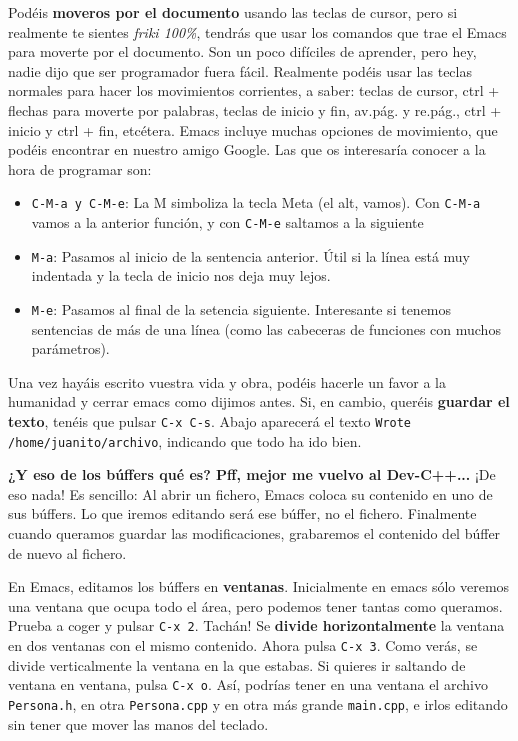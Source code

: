 \documentclass[landscape]{article}
\begin{document}
\begin{multicols*}{2}
Podéis \textbf{moveros por el documento} usando las teclas de cursor, pero si realmente te sientes \textit{friki 100\%}, tendrás que usar los comandos que trae el Emacs para moverte por el documento. Son un poco difíciles de aprender, pero hey, nadie dijo que ser programador fuera fácil. Realmente podéis usar las teclas normales para hacer los movimientos corrientes, a saber: teclas de cursor, ctrl + flechas para moverte por palabras, teclas de inicio y fin, av.pág. y re.pág., ctrl + inicio y ctrl + fin, etcétera. Emacs incluye muchas opciones de movimiento, que podéis encontrar en nuestro amigo Google. Las que os interesaría conocer a la hora de programar son:
\vspace{-0.5cm}
\begin{itemize}
 \item \texttt{C-M-a y C-M-e}: La M simboliza la tecla Meta (el alt, vamos). Con \texttt{C-M-a} vamos a la anterior función, y con \texttt{C-M-e} saltamos a la siguiente
\item \texttt{M-a}: Pasamos al inicio de la sentencia anterior. Útil si la línea está muy indentada y la tecla de inicio nos deja muy lejos.
\item \texttt{M-e}: Pasamos al final de la setencia siguiente. Interesante si tenemos sentencias de más de una línea (como las cabeceras de funciones con muchos parámetros).
\end{itemize}

Una vez hayáis escrito vuestra vida y obra, podéis hacerle un favor a la humanidad y cerrar emacs como dijimos antes. Si, en cambio, queréis \textbf{guardar el texto}, tenéis que pulsar \texttt{C-x C-s}. Abajo aparecerá el texto \texttt{Wrote /home/juanito/archivo}, indicando que todo ha ido bien.

\textbf{¿Y eso de los búffers qué es? Pff, mejor me vuelvo al Dev-C++...} ¡De eso nada! Es sencillo: Al abrir un fichero, Emacs coloca su contenido en uno de sus búffers. Lo que iremos editando será ese búffer, no el fichero. Finalmente cuando queramos guardar las modificaciones, grabaremos el contenido del búffer de nuevo al fichero.

En Emacs, editamos los búffers en \textbf{ventanas}. Inicialmente en emacs sólo veremos una ventana que ocupa todo el área, pero podemos tener tantas como queramos. Prueba a coger y pulsar \texttt{C-x 2}. Tachán! Se \textbf{divide horizontalmente} la ventana en dos ventanas con el mismo contenido. Ahora pulsa \texttt{C-x 3}. Como verás, se divide verticalmente la ventana en la que estabas. Si quieres ir saltando de ventana en ventana, pulsa \texttt{C-x o}. Así, podrías tener en una ventana el archivo \texttt{Persona.h}, en otra \texttt{Persona.cpp} y en otra más grande \texttt{main.cpp}, e irlos editando sin tener que mover las manos del teclado.


\end{multicols*}
\end{document}
